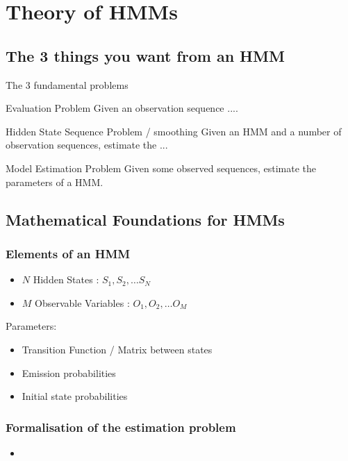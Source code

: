 \section{Theory of HMMs}
\label{sec:theory}

\subsection{The 3 things you want from an HMM}
\label{sec:problems}

\begin{frame}
  
  The 3 fundamental problems \cite{rabiner1989tutorial}

  \begin{block}{Evaluation Problem}
    Given an observation sequence ....
  \end{block}
  \pause
  \begin{block}{Hidden State Sequence Problem / smoothing}
    Given an HMM and a number of observation sequences, estimate the ...
  \end{block}
  \pause
  \begin{block}{Model Estimation Problem}
    Given some observed sequences, estimate the parameters of a HMM.
  \end{block}

\end{frame}


\subsection{Mathematical Foundations for HMMs}
\label{sec:math}

\begin{frame}
  \frametitle{Elements of an HMM}
  \begin{itemize}
  \item $N$ Hidden States : $S_1,S_2, \ldots S_N$
  \item $M$ Observable Variables : $O_1, O_2, \ldots O_M$
  \end{itemize}
  Parameters:
  \begin{itemize}
  \item Transition Function / Matrix between states
  \item Emission probabilities
  \item Initial state probabilities
  \end{itemize}
\end{frame}
\begin{frame}
  \frametitle{Formalisation of the estimation problem}
  \begin{itemize}
  \item
  \end{itemize}
\end{frame}

